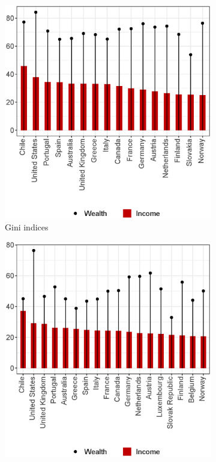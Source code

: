 \begin{refsection}
\begin{figure}[h]
  \caption{Comparison of wealth and income gini indices and concentration}
  \label{ch3fig:wealthincome_comp}
  \centering
  \begin{subfigure}{0.49\textwidth}
    \includegraphics[width=0.9\linewidth]{Figures/ch3/wealthincome_comp}
    \caption{Gini indices}
    \label{ch3fig:wealthincome_comp_a}
  \end{subfigure}
  \begin{subfigure}{0.49\textwidth}
    \includegraphics[width=0.9\linewidth]{Figures/ch3/wealthincome_comp_oecd}

\end{subfigure}
\end{figure}
\end{refsection}
